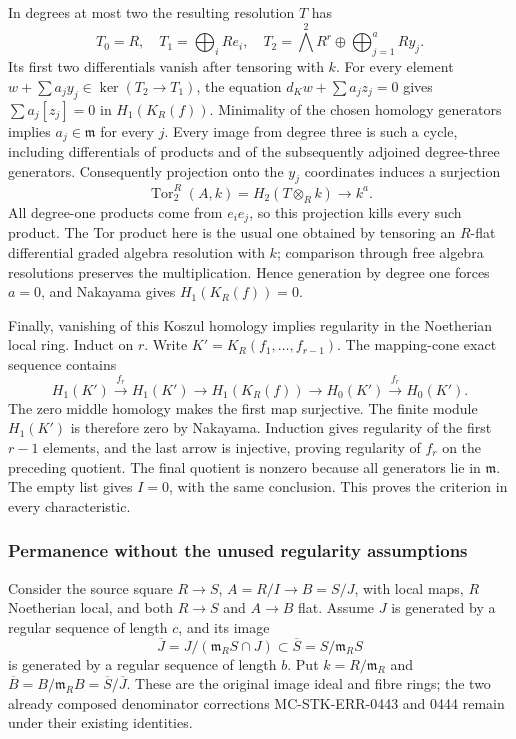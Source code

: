 In degrees at most two the resulting resolution \(T\) has \[
T_0=R,\quad T_1=\bigoplus_i Re_i,\quad
T_2=\bigwedge^2R^r\oplus\bigoplus_{j=1}^a Ry_j.
\] Its first two differentials vanish after tensoring with \(k\). For every element \(w+\sum a_jy_j\in\ker(T_2\to T_1)\), the equation \(d_Kw+\sum a_jz_j=0\) gives \(\sum a_j[z_j]=0\) in \(H_1(K_R(f))\). Minimality of the chosen homology generators implies \(a_j\in\mathfrak m\) for every \(j\). Every image from degree three is such a cycle, including differentials of products and of the subsequently adjoined degree-three generators. Consequently projection onto the \(y_j\) coordinates induces a surjection \[
\operatorname{Tor}^R_2(A,k)=H_2(T\otimes_R k)\longrightarrow k^a.
\] All degree-one products come from \(e_i e_j\), so this projection kills every such product. The Tor product here is the usual one obtained by tensoring an \(R\)-flat differential graded algebra resolution with \(k\); comparison through free algebra resolutions preserves the multiplication. Hence generation by degree one forces \(a=0\), and Nakayama gives \(H_1(K_R(f))=0\).

Finally, vanishing of this Koszul homology implies regularity in the Noetherian local ring. Induct on \(r\). Write \(K'=K_R(f_1,\ldots,f_{r-1})\). The mapping-cone exact sequence contains \[
H_1(K')\xrightarrow{f_r}H_1(K')\to H_1(K_R(f))
\to H_0(K')\xrightarrow{f_r}H_0(K').
\] The zero middle homology makes the first map surjective. The finite module \(H_1(K')\) is therefore zero by Nakayama. Induction gives regularity of the first \(r-1\) elements, and the last arrow is injective, proving regularity of \(f_r\) on the preceding quotient. The final quotient is nonzero because all generators lie in \(\mathfrak m\). The empty list gives \(I=0\), with the same conclusion. This proves the criterion in every characteristic.

\subsubsection{Permanence without the unused regularity assumptions}\label{permanence-without-the-unused-regularity-assumptions}

Consider the source square \(R\to S\), \(A=R/I\to B=S/J\), with local maps, \(R\) Noetherian local, and both \(R\to S\) and \(A\to B\) flat. Assume \(J\) is generated by a regular sequence of length \(c\), and its image \[
\overline J=J/(\mathfrak m_RS\cap J)\subset\overline S=S/\mathfrak m_RS
\] is generated by a regular sequence of length \(b\). Put \(k=R/\mathfrak m_R\) and \(\overline B=B/\mathfrak m_RB=\overline S/\overline J\). These are the original image ideal and fibre rings; the two already composed denominator corrections MC-STK-ERR-0443 and 0444 remain under their existing identities.

